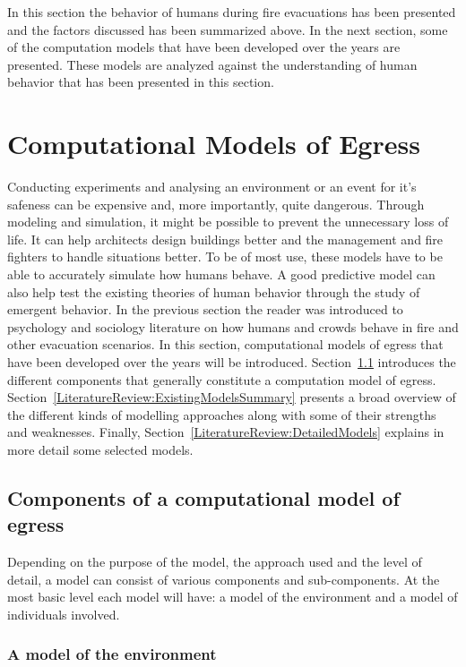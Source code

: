In this section the behavior of humans during fire evacuations has been presented and the factors discussed has been summarized above. In the next section, some of the computation models that have been developed over the years are presented. These models are analyzed against the understanding of human behavior that has been presented in this section.

\section{Computational Models of Egress}
\label{LiteratureReview:EngineeringModels}

Conducting experiments and analysing an environment or an event for it's safeness can be expensive and, more importantly, quite dangerous. Through modeling and simulation,  it might be possible to prevent the unnecessary loss of life. It can help architects design buildings better and the management and fire fighters to handle situations better. To be of most use, these models have to be able to accurately simulate how humans behave. A good predictive model can also help test the existing theories of human behavior through the study of emergent behavior. In the previous section the reader was introduced to psychology and sociology literature on how humans and crowds behave in fire and other evacuation scenarios. In this section, computational models of egress that have been developed over the years will be introduced. Section~\ref{LiteratureReview:ComponentsOfAModel} introduces the different components that generally constitute a computation model of egress. Section~\ref{LiteratureReview:ExistingModelsSummary} presents a broad overview of the different kinds of modelling approaches along with some of their strengths and weaknesses. Finally, Section~\ref{LiteratureReview:DetailedModels} explains in more detail some selected models.

\subsection{Components of a computational model of egress}
\label{LiteratureReview:ComponentsOfAModel}

Depending on the purpose of the model, the approach used and the level of detail, a model can consist of various components and sub-components. At the most basic level each model will have: a model of the environment and a model of individuals involved.

\subsubsection{A model of the environment}


